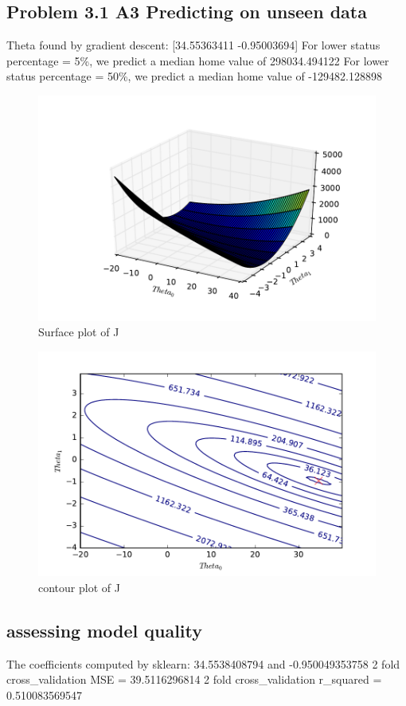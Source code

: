 \documentclass[pdftex,11pt]{article}
\begin{document}
\subsection{Problem 3.1 A3 Predicting on unseen data}
Theta found by gradient descent: [34.55363411  -0.95003694]
For lower status percentage = 5\%, we predict a median home value of 298034.494122
For lower status percentage = 50\%, we predict a median home value of -129482.128898
\begin{figure}
  \caption{Surface plot of J}
  \centering
    \includegraphics[scale=1]{fig3a.pdf}
\end{figure}
\begin{figure}
  \caption{contour plot of J}
  \centering
    \includegraphics[scale=1]{fig3b.pdf}
\end{figure}
\subsection{assessing model quality}
The coefficients computed by sklearn:  34.5538408794  and  -0.950049353758
2  fold cross\_validation MSE =  39.5116296814
2  fold cross\_validation r\_squared =  0.510083569547
\end{document}
